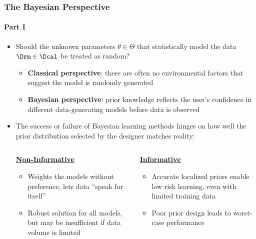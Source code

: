 \documentclass[aspectratio=169,usenames,dvipsnames]{beamer}
\begin{document}
\begin{frame}
\frametitle{The Bayesian Perspective}
\framesubtitle{Part I}

\begin{itemize}
\item Should the unknown parameters $\theta \in \Theta$ that statistically model the data $\Drm \in \Dcal$ be treated as random?
	\vspace{0.25em}
	\begin{itemize}
	\item \textbf{Classical perspective}: there are often no environmental factors that suggest the model is randomly generated
	\vspace{0.25em}
	\item \textbf{Bayesian perspective}: prior knowledge reflects the user's confidence in different data-generating models before data is observed 
	\end{itemize}
\vspace{0.5em}
\item The success or failure of Bayesian learning methods hinges on how well the \alert{prior distribution} selected by the designer matches reality:

\vspace{0.5em}
\begin{columns}[T]


\begin{column}{.5\textwidth}

\centering
\large \textbf{\underline{Non-Informative}} \normalsize
\vspace{0.1em}
\begin{itemize}
\item Weights the models without preference, lets data ``speak for itself''
\item Robust solution for all models, but may be insufficient if data volume is limited
\end{itemize}

\end{column}

\vrule

\begin{column}{.5\textwidth}

\centering
\large \textbf{\underline{Informative}} \normalsize
\vspace{0.1em}
\begin{itemize}
\item Accurate localized priors enable low risk learning, even with limited training data
\item Poor prior design leads to worst-case performance
\end{itemize}


\end{column}

\end{columns}

\end{itemize}
\vspace{0.5em}

\end{frame}
\end{document}

